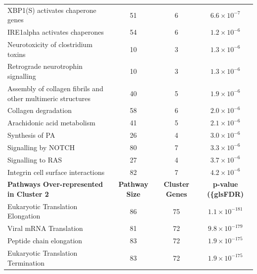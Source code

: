 \begin{table}[!hp]
{\begin{threeparttable}
\begin{tabular}{lccc}
  XBP1(S) activates chaperone genes &  51 &   6 & $6.6 \times 10^{-7}$ \\
  \rowcolor{Cluster_Blue!20} 
  IRE1alpha activates chaperones &  54 &   6 & $1.2 \times 10^{-6}$ \\
  \rowcolor{Cluster_Blue!15} 
  Neurotoxicity of clostridium toxins &  10 &   3 & $1.3 \times 10^{-6}$ \\
  \rowcolor{Cluster_Blue!20} 
  Retrograde neurotrophin signalling &  10 &   3 & $1.3 \times 10^{-6}$ \\
  \rowcolor{Cluster_Blue!15} 
  Assembly of collagen fibrils and other multimeric structures &  40 &   5 & $1.9 \times 10^{-6}$ \\
  \rowcolor{Cluster_Blue!20} 
  Collagen degradation &  58 &   6 & $2.0 \times 10^{-6}$ \\
  \rowcolor{Cluster_Blue!15} 
  Arachidonic acid metabolism &  41 &   5 & $2.1 \times 10^{-6}$ \\
  \rowcolor{Cluster_Blue!20} 
  Synthesis of PA &  26 &   4 & $3.0 \times 10^{-6}$ \\
  \rowcolor{Cluster_Blue!15} 
  Signalling by NOTCH &  80 &   7 & $3.3 \times 10^{-6}$ \\
  \rowcolor{Cluster_Blue!20} 
  Signalling to RAS &  27 &   4 & $3.7 \times 10^{-6}$ \\
  \rowcolor{Cluster_Blue!15} 
  Integrin cell surface interactions &  82 &   7 & $4.2 \times 10^{-6}$ \\
  \hline
  \cellcolor{white} \large{\textbf{Pathways Over-represented in Cluster 2}} & \large{\textbf{Pathway Size}} & \large{\textbf{Cluster Genes}} & \large{\textbf{p-value (\{gls{FDR})}} \\ %
  \hline
  \rowcolor{Cluster_Green!20}
  Eukaryotic Translation Elongation &  86 &  75 & $1.1 \times 10^{-181}$ \\
  \rowcolor{Cluster_Green!15} 
  Viral \acrshort{mRNA} Translation &  81 &  72 & $9.8 \times 10^{-179}$ \\
  \rowcolor{Cluster_Green!20} 
  Peptide chain elongation &  83 &  72 & $1.9 \times 10^{-175}$ \\
  \rowcolor{Cluster_Green!15} 
  Eukaryotic Translation Termination &  83 &  72 & $1.9 \times 10^{-175}$ \\

\end{tabular}
\end{threeparttable}}
\end{table}
